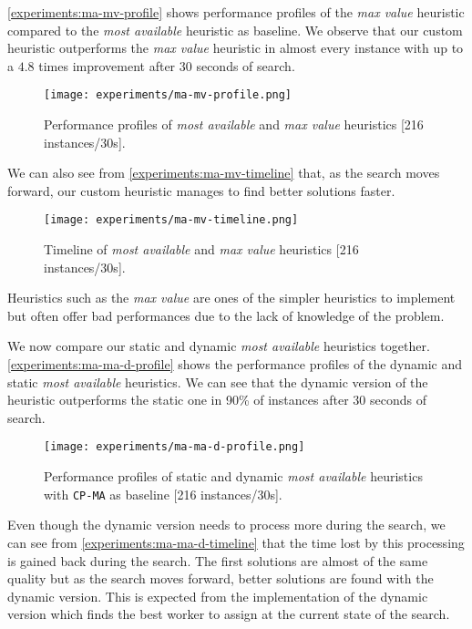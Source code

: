 \documentclass[../../thesis.tex]{subfiles}
\begin{document}
\autoref{experiments:ma-mv-profile} shows performance profiles of the  \emph{max value} heuristic compared to the  \emph{most available} heuristic 
as baseline. We observe that our custom heuristic outperforms the  \emph{max value} heuristic in almost every instance with 
up to a $4.8$ times improvement after 30 seconds of search.

\begin{figure}
  \centering
  \texttt{[image: experiments/ma-mv-profile.png]}
  \caption{Performance profiles of \emph{most available} and \emph{max value} heuristics [216 instances/30s].}
  \label{experiments:ma-mv-profile}
\end{figure}

We can also see from \autoref{experiments:ma-mv-timeline} that, as the search moves forward, our custom heuristic manages to 
find better solutions faster.

\begin{figure}
  \centering
  \texttt{[image: experiments/ma-mv-timeline.png]}
  \caption{Timeline of \emph{most available} and  \emph{max value} heuristics [216 instances/30s].}
  \label{experiments:ma-mv-timeline}
\end{figure}

Heuristics such as the  \emph{max value} are ones of the simpler heuristics to implement but often offer bad performances due to 
the lack of knowledge of the problem.

\FloatBarrier

We now compare our static and dynamic  \emph{most available} heuristics together.
\autoref{experiments:ma-ma-d-profile} shows the performance profiles of the dynamic and static  \emph{most available} heuristics.
We can see that the dynamic version of the heuristic outperforms the static one in 90\% of instances after 30 seconds of search.

\begin{figure}
  \centering
  \texttt{[image: experiments/ma-ma-d-profile.png]}
  \caption{Performance profiles of static and dynamic  \emph{most available} heuristics with \texttt{CP-MA} as baseline [216 instances/30s].}
  \label{experiments:ma-ma-d-profile}
\end{figure}


Even though the dynamic version needs to process more during the search, we can see from \autoref{experiments:ma-ma-d-timeline} that the time lost 
by this processing is gained back during the search. The first solutions are almost of the same quality but 
as the search moves forward, better solutions are found with the dynamic version. 
This is expected from the implementation of the dynamic version which finds the best worker to assign 
at the current state of the search.
\end{document}
